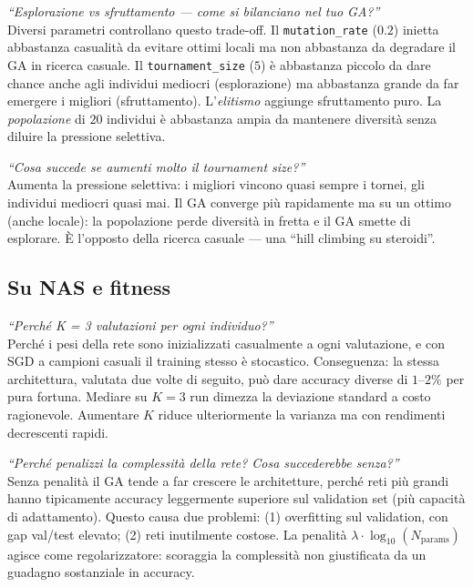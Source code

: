 \documentclass[11pt,a4paper]{article}
\begin{document}
\begin{domanda}
\textit{``Esplorazione vs sfruttamento --- come si bilanciano nel tuo GA?''}\\
Diversi parametri controllano questo trade-off. Il \texttt{mutation\_rate}
($0.2$) inietta abbastanza casualità da evitare ottimi locali ma non
abbastanza da degradare il GA in ricerca casuale. Il \texttt{tournament\_size}
($5$) è abbastanza piccolo da dare chance anche agli individui mediocri
(esplorazione) ma abbastanza grande da far emergere i migliori
(sfruttamento). L'\emph{elitismo} aggiunge sfruttamento puro. La
\emph{popolazione} di $20$ individui è abbastanza ampia da mantenere
diversità senza diluire la pressione selettiva.
\end{domanda}

\begin{domanda}
\textit{``Cosa succede se aumenti molto il tournament size?''}\\
Aumenta la pressione selettiva: i migliori vincono quasi sempre i
tornei, gli individui mediocri quasi mai. Il GA converge più rapidamente
ma su un ottimo (anche locale): la popolazione perde diversità in fretta
e il GA smette di esplorare. È l'opposto della ricerca casuale --- una
``hill climbing su steroidi''.
\end{domanda}

\subsection{Su NAS e fitness}

\begin{domanda}
\textit{``Perché K = 3 valutazioni per ogni individuo?''}\\
Perché i pesi della rete sono inizializzati casualmente a ogni
valutazione, e con SGD a campioni casuali il training stesso è
stocastico. Conseguenza: la stessa architettura, valutata due volte di
seguito, può dare accuracy diverse di $1$--$2\%$ per pura fortuna.
Mediare su $K=3$ run dimezza la deviazione standard a costo
ragionevole. Aumentare $K$ riduce ulteriormente la varianza ma con
rendimenti decrescenti rapidi.
\end{domanda}

\begin{domanda}
\textit{``Perché penalizzi la complessità della rete? Cosa succederebbe senza?''}\\
Senza penalità il GA tende a far crescere le architetture, perché reti
più grandi hanno tipicamente accuracy leggermente superiore sul
validation set (più capacità di adattamento). Questo causa due problemi:
(1) overfitting sul validation, con gap val/test elevato; (2) reti
inutilmente costose. La penalità $\lambda \cdot \log_{10}(N_{\text{params}})$
agisce come regolarizzatore: scoraggia la complessità non giustificata
da un guadagno sostanziale in accuracy.
\end{domanda}
\end{document}
